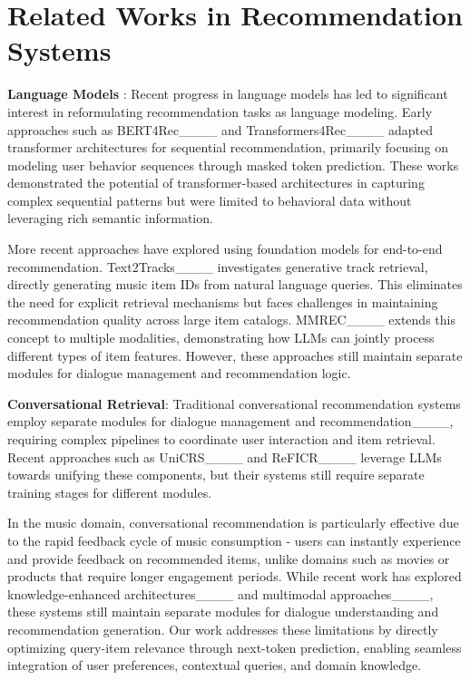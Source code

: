 \section{Related Works in Recommendation Systems}
\textbf{Language Models
}: 
Recent progress in language models has led to significant interest in reformulating recommendation tasks as language modeling. Early approaches such as BERT4Rec____ and Transformers4Rec____ adapted transformer architectures for sequential recommendation, primarily focusing on modeling user behavior sequences through masked token prediction. These works demonstrated the potential of transformer-based architectures in capturing complex sequential patterns but were limited to behavioral data without leveraging rich semantic information.

More recent approaches have explored using foundation models for end-to-end recommendation. Text2Tracks____ investigates generative track retrieval, directly generating music item IDs from natural language queries. This eliminates the need for explicit retrieval mechanisms but faces challenges in maintaining recommendation quality across large item catalogs. MMREC____ extends this concept to multiple modalities, demonstrating how LLMs can jointly process different types of item features. However, these approaches still maintain separate modules for dialogue management and recommendation logic.


\textbf{Conversational Retrieval}:
Traditional conversational recommendation systems employ separate modules for dialogue management and recommendation____, requiring complex pipelines to coordinate user interaction and item retrieval. Recent approaches such as UniCRS____ and ReFICR____ leverage LLMs towards unifying these components, but their systems still require separate training stages for different modules.

In the music domain, conversational recommendation is particularly effective due to the rapid feedback cycle of music consumption - users can instantly experience and provide feedback on recommended items, unlike domains such as movies or products that require longer engagement periods. While recent work has explored knowledge-enhanced architectures____ and multimodal approaches____, these systems still maintain separate modules for dialogue understanding and recommendation generation. Our work addresses these limitations by directly optimizing query-item relevance through next-token prediction, enabling seamless integration of user preferences, contextual queries, and domain knowledge.

